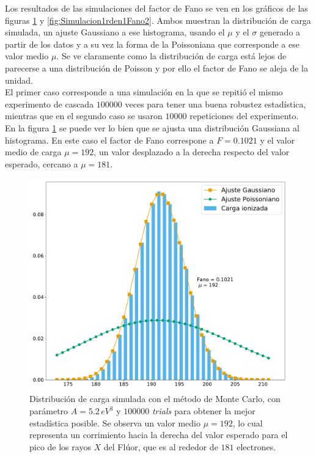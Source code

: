 \indent Los resultados de las simulaciones del factor de Fano se ven en los gráficos de las figuras \ref{fig:Simulacion1rden1Fano1} y \ref{fig:Simulacion1rden1Fano2}. Ambos muestran la distribución de carga simulada, un ajuste Gaussiano a ese histograma, usando el $\mu$ y el $\sigma$ generado a partir de los datos y a su vez la forma de la Poissoniana que corresponde a ese valor medio $\mu$. Se ve claramente como la distribución de carga está lejos de parecerse a una distribución de Poisson y por ello el factor de Fano se aleja de la unidad.\\
\indent El primer caso corresponde a una simulación en la que se repitió el mismo experimento de cascada $100000$ veces para tener una buena robustez estadística, mientras que en el segundo caso se usaron $10000$ repeticiones del experimento.\\
\indent En la figura \ref{fig:Simulacion1rden1Fano1} se puede ver lo bien que se ajusta una distribución Gaussiana al histograma. En este caso el factor de Fano correspone a $F = 0.1021$ y el valor medio de carga $\mu = 192$, un valor desplazado a la derecha respecto del valor esperado, cercano a $\mu = 181$.
\begin{figure}%
    \centering
    \includegraphics[scale=0.35]{Figs/Fano_677_Eloss0_100ktrials.pdf}
    \caption{\footnotesize{Distribución de carga simulada con el método de Monte Carlo, con parámetro $A = 5.2\,\si{eV}^{3}$ y $100000$ \textit{trials} para obtener la mejor estadística posible. Se observa un valor medio $\mu = 192$, lo cual representa un corrimiento hacia la derecha del valor esperado para el pico de los rayos $X$ del Flúor, que es al rededor de $181$ electrones.}}
    \label{fig:Simulacion1rden1Fano1}
\end{figure}
